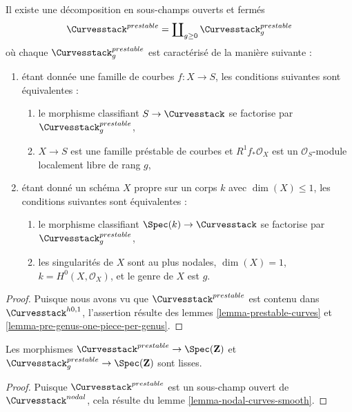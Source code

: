 \begin{lemma}
\label{lemma-prestable-one-piece-per-genus}
Il existe une décomposition en sous-champs ouverts et fermés
$$
\Curvesstack^{prestable} = \coprod\nolimits_{g \geq 0}
\Curvesstack^{prestable}_g
$$
où chaque $\Curvesstack^{prestable}_g$ est caractérisé de la manière suivante :
\begin{enumerate}
\item étant donnée une famille de courbes $f : X \to S$, les conditions suivantes sont équivalentes :
\begin{enumerate}
\item le morphisme classifiant $S \to \Curvesstack$ se factorise
par $\Curvesstack^{prestable}_g$,
\item $X \to S$ est une famille préstable de courbes et
$R^1f_*\mathcal{O}_X$ est un $\mathcal{O}_S$-module localement libre de rang $g$,
\end{enumerate}
\item étant donné un schéma $X$ propre sur un corps $k$ avec
$\dim(X) \leq 1$, les conditions suivantes sont équivalentes :
\begin{enumerate}
\item le morphisme classifiant $\Spec(k) \to \Curvesstack$
se factorise par $\Curvesstack^{prestable}_g$,
\item les singularités de $X$ sont au plus nodales, $\dim(X) = 1$,
$k = H^0(X, \mathcal{O}_X)$, et le genre de $X$ est $g$.
\end{enumerate}
\end{enumerate}
\end{lemma}

\begin{proof}
Puisque nous avons vu que $\Curvesstack^{prestable}$ est contenu
dans $\Curvesstack^{h0, 1}$, l'assertion résulte des
lemmes \ref{lemma-prestable-curves} et
\ref{lemma-pre-genus-one-piece-per-genus}.
\end{proof}

\begin{lemma}
\label{lemma-prestable-curves-smooth}
Les morphismes
$\Curvesstack^{prestable} \to \Spec(\mathbf{Z})$ et
$\Curvesstack^{prestable}_g \to \Spec(\mathbf{Z})$ sont
lisses.
\end{lemma}

\begin{proof}
Puisque $\Curvesstack^{prestable}$ est un sous-champ ouvert de
$\Curvesstack^{nodal}$, cela résulte du
lemme \ref{lemma-nodal-curves-smooth}.
\end{proof}




